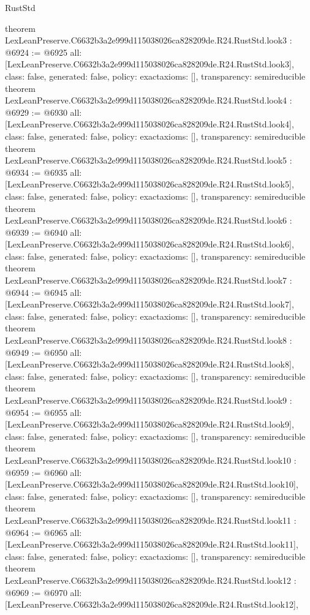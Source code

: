 \begin{lexlean}{RustStd}
\begin{coremodule}
{}
theorem LexLeanPreserve.C6632b3a2e999d115038026ca828209de.R24.RustStd.look3 : @6924 := @6925 {
  all: [LexLeanPreserve.C6632b3a2e999d115038026ca828209de.R24.RustStd.look3],
  class: false,
  generated: false,
  policy: exact{axioms: []},
  transparency: semireducible
}
theorem LexLeanPreserve.C6632b3a2e999d115038026ca828209de.R24.RustStd.look4 : @6929 := @6930 {
  all: [LexLeanPreserve.C6632b3a2e999d115038026ca828209de.R24.RustStd.look4],
  class: false,
  generated: false,
  policy: exact{axioms: []},
  transparency: semireducible
}
theorem LexLeanPreserve.C6632b3a2e999d115038026ca828209de.R24.RustStd.look5 : @6934 := @6935 {
  all: [LexLeanPreserve.C6632b3a2e999d115038026ca828209de.R24.RustStd.look5],
  class: false,
  generated: false,
  policy: exact{axioms: []},
  transparency: semireducible
}
theorem LexLeanPreserve.C6632b3a2e999d115038026ca828209de.R24.RustStd.look6 : @6939 := @6940 {
  all: [LexLeanPreserve.C6632b3a2e999d115038026ca828209de.R24.RustStd.look6],
  class: false,
  generated: false,
  policy: exact{axioms: []},
  transparency: semireducible
}
theorem LexLeanPreserve.C6632b3a2e999d115038026ca828209de.R24.RustStd.look7 : @6944 := @6945 {
  all: [LexLeanPreserve.C6632b3a2e999d115038026ca828209de.R24.RustStd.look7],
  class: false,
  generated: false,
  policy: exact{axioms: []},
  transparency: semireducible
}
theorem LexLeanPreserve.C6632b3a2e999d115038026ca828209de.R24.RustStd.look8 : @6949 := @6950 {
  all: [LexLeanPreserve.C6632b3a2e999d115038026ca828209de.R24.RustStd.look8],
  class: false,
  generated: false,
  policy: exact{axioms: []},
  transparency: semireducible
}
theorem LexLeanPreserve.C6632b3a2e999d115038026ca828209de.R24.RustStd.look9 : @6954 := @6955 {
  all: [LexLeanPreserve.C6632b3a2e999d115038026ca828209de.R24.RustStd.look9],
  class: false,
  generated: false,
  policy: exact{axioms: []},
  transparency: semireducible
}
theorem LexLeanPreserve.C6632b3a2e999d115038026ca828209de.R24.RustStd.look10 : @6959 := @6960 {
  all: [LexLeanPreserve.C6632b3a2e999d115038026ca828209de.R24.RustStd.look10],
  class: false,
  generated: false,
  policy: exact{axioms: []},
  transparency: semireducible
}
theorem LexLeanPreserve.C6632b3a2e999d115038026ca828209de.R24.RustStd.look11 : @6964 := @6965 {
  all: [LexLeanPreserve.C6632b3a2e999d115038026ca828209de.R24.RustStd.look11],
  class: false,
  generated: false,
  policy: exact{axioms: []},
  transparency: semireducible
}
theorem LexLeanPreserve.C6632b3a2e999d115038026ca828209de.R24.RustStd.look12 : @6969 := @6970 {
  all: [LexLeanPreserve.C6632b3a2e999d115038026ca828209de.R24.RustStd.look12],
}
\end{coremodule}
\end{lexlean}
